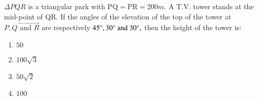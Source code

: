 \item $\Delta{PQR}$ is a triangular park with $\text{PQ}=\text{PR}=200m$. A T.V. tower stands at the mid-point of QR. If the angles of the elevation of the top of the tower at $\vec{P,Q \text{ and } R}$ are respectively $45\degree , 30\degree \text{ and } 30\degree,$ then the height of the tower  is: \hfill{}
\begin{multicols}{4}
\begin{enumerate}
        \item $50$                    
        \item $100\sqrt{3}$ 
        \item $50\sqrt{2}$ 
        \item $100$
\end{enumerate}
\end{multicols} 


